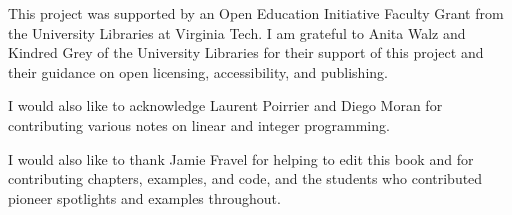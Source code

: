 This project was supported by an Open Education Initiative Faculty Grant from the University Libraries at Virginia Tech.  I am grateful to Anita Walz and Kindred Grey of the University Libraries for their support of this project and their guidance on open licensing, accessibility, and publishing.

I would also like to acknowledge Laurent Poirrier and Diego Moran for contributing various notes on linear and integer programming.

I would also like to thank Jamie Fravel for helping to edit this book and for contributing chapters, examples, and code, and the students who contributed pioneer spotlights and examples throughout.

\newpage
